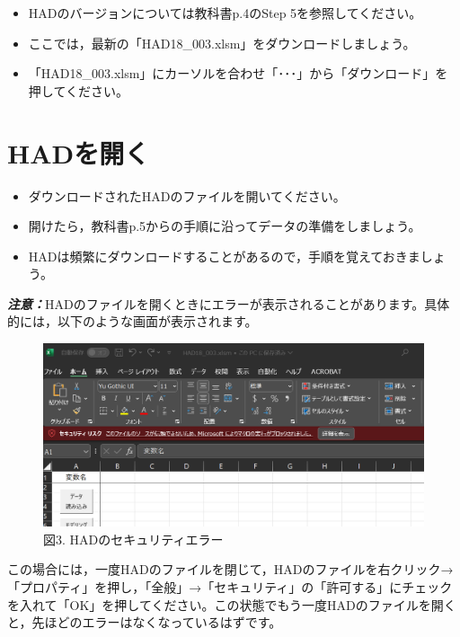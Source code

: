 \documentclass[
]{book}
\providecommand{\tightlist}{%
  \setlength{\itemsep}{0pt}\setlength{\parskip}{0pt}}
\theoremstyle{definition}
\theoremstyle{definition}
\theoremstyle{definition}
\theoremstyle{definition}
\theoremstyle{remark}
\begin{document}
\begin{itemize}
\tightlist
\item
  HADのバージョンについては教科書p.4のStep 5を参照してください。
\item
  ここでは，最新の「HAD18\_003.xlsm」をダウンロードしましょう。
\item
  「HAD18\_003.xlsm」にカーソルを合わせ「･･･」から「ダウンロード」を押してください。
\end{itemize}

\hypertarget{hadux3092ux958bux304f}{%
\section{HADを開く}\label{hadux3092ux958bux304f}}

\begin{itemize}
\tightlist
\item
  ダウンロードされたHADのファイルを開いてください。
\item
  開けたら，教科書p.5からの手順に沿ってデータの準備をしましょう。
\item
  HADは頻繁にダウンロードすることがあるので，手順を覚えておきましょう。
\end{itemize}

\textbf{\emph{注意：}}HADのファイルを開くときにエラーが表示されることがあります。具体的には，以下のような画面が表示されます。

\begin{figure}
\centering
\includegraphics{images/1.2_HADのセキュリティエラー.png}
\caption{図3. HADのセキュリティエラー}
\end{figure}

この場合には，一度HADのファイルを閉じて，HADのファイルを右クリック→「プロパティ」を押し，「全般」→「セキュリティ」の「許可する」にチェックを入れて「OK」を押してください。この状態でもう一度HADのファイルを開くと，先ほどのエラーはなくなっているはずです。
\end{document}
